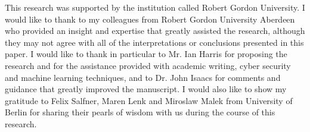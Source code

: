 This research was supported by the institution called Robert Gordon University.
I would like to thank to my colleagues from Robert Gordon University Aberdeen who provided an insight and expertise
that greatly assisted the research, although they may not agree with all of the interpretations or conclusions
presented in this paper.
\newline
\newline
I would like to thank in particular to Mr. Ian Harris for proposing the research and for the assistance
provided with academic writing, cyber security and machine learning techniques, and to Dr. John Isaacs
for comments and guidance that greatly improved the manuscript.
\newline
\newline
I would also like to show my gratitude to Felix Salfner, Maren Lenk and Miroslaw Malek from University of Berlin
for sharing their pearls of wisdom with us during the course of this research.
